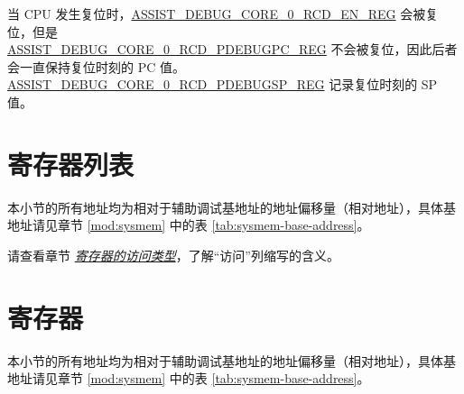 \documentclass[main\_\_CN.tex]{subfiles}
\begin{document}
当 CPU 发生复位时，\hyperref[regdesc:ASSISTDEBUGCORE0RCDENREG]{ASSIST\_DEBUG\_CORE\_0\_RCD\_EN\_REG} 会被复位，但是\\ \hyperref[regdesc:ASSISTDEBUGCORE0RCDPDEBUGPCREG]{ASSIST\_DEBUG\_CORE\_0\_RCD\_PDEBUGPC\_REG} 不会被复位，因此后者会一直保持复位时刻的 PC 值。\hyperref[regdesc:ASSISTDEBUGCORE0RCDPDEBUGSPREG]{ASSIST\_DEBUG\_CORE\_0\_RCD\_PDEBUGSP\_REG} 记录复位时刻的 SP 值。



\clearpage
\section{寄存器列表}
\label{sec:dbgassist-reg-summ}
\hypertarget{dbgassist-reg-summ}{}

本小节的所有地址均为相对于辅助调试基地址的地址偏移量（相对地址），具体基地址请见章节 \ref{mod:sysmem} \textit{} 中的表 \ref{tab:sysmem-base-address}。

请查看章节 \hyperref[glossary-access-types]{\textit{寄存器的访问类型}}，了解“访问”列缩写的含义。




\clearpage
\section{寄存器}\label{subsec:registers}

本小节的所有地址均为相对于辅助调试基地址的地址偏移量（相对地址），具体基地址请见章节 \ref{mod:sysmem} \textit{} 中的表 \ref{tab:sysmem-base-address}。


\end{document}
